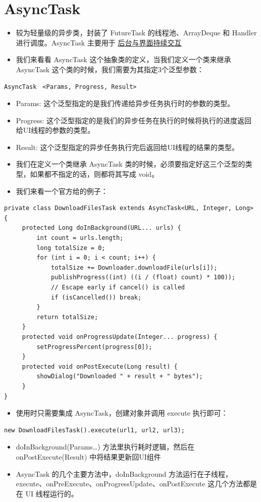 \documentclass[9pt, b5paper]{article}
\begin{document}
\section{AsyncTask}
\label{sec-3}
\begin{itemize}
\item 较为轻量级的异步类，封装了 FutureTask 的线程池、ArrayDeque 和 Handler 进行调度。AsyncTask 主要用于 \uline{后台与界面持续交互}
\item 我们来看看 AsyncTask 这个抽象类的定义，当我们定义一个类来继承 AsyncTask 这个类的时候，我们需要为其指定3个泛型参数：
\end{itemize}
\begin{verbatim}
AsyncTask　<Params, Progress, Result>
\end{verbatim}
\begin{itemize}
\item Params: 这个泛型指定的是我们传递给异步任务执行时的参数的类型。
\item Progress: 这个泛型指定的是我们的异步任务在执行的时候将执行的进度返回给UI线程的参数的类型。
\item Result: 这个泛型指定的异步任务执行完后返回给UI线程的结果的类型。
\item 我们在定义一个类继承 AsyncTask 类的时候，必须要指定好这三个泛型的类型，如果都不指定的话，则都将其写成 void。
\item 我们来看一个官方给的例子：
\end{itemize}
\begin{verbatim}
private class DownloadFilesTask extends AsyncTask<URL, Integer, Long> {
     protected Long doInBackground(URL... urls) {
         int count = urls.length;
         long totalSize = 0;
         for (int i = 0; i < count; i++) {
             totalSize += Downloader.downloadFile(urls[i]);
             publishProgress((int) ((i / (float) count) * 100));
             // Escape early if cancel() is called
             if (isCancelled()) break;
         }
         return totalSize;
     }
     protected void onProgressUpdate(Integer... progress) {
         setProgressPercent(progress[0]);
     }
     protected void onPostExecute(Long result) {
         showDialog("Downloaded " + result + " bytes");
     }
}
\end{verbatim}
\begin{itemize}
\item 使用时只需要集成 AsyncTask，创建对象并调用 execute 执行即可：
\end{itemize}
\begin{verbatim}
new DownloadFilesTask().execute(url1, url2, url3);
\end{verbatim}
\begin{itemize}
\item doInBackground(Params…) 方法里执行耗时逻辑，然后在 onPostExecute(Result) 中将结果更新回UI组件
\item AsyncTask 的几个主要方法中，doInBackground 方法运行在子线程，execute、onPreExecute、onProgressUpdate、onPostExecute 这几个方法都是在 UI 线程运行的。
\end{itemize}
\end{document}

